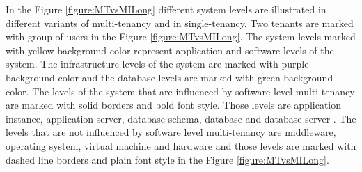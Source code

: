 \documentclass[conference]{sasmoota2017}
\begin{document}
In the Figure \ref{figure:MTvsMILong} different system levels are illustrated in different variants of multi-tenancy and in single-tenancy. Two tenants are marked with group of users in the Figure \ref{figure:MTvsMILong}. The system levels marked with yellow background color represent application and software levels of the system. The infrastructure levels of the system are marked with purple background color and the database levels are marked with green background color. The levels of the system that are influenced by software level multi-tenancy are marked with solid borders and bold font style. Those levels are application instance, application server, database schema, database and database server \cite{Kabbedijk2015:Defining}. The levels that are not influenced by software level multi-tenancy are middleware, operating system, virtual machine and hardware and those levels are marked with dashed line borders and plain font style in the Figure \ref{figure:MTvsMILong}. 
\end{document}
